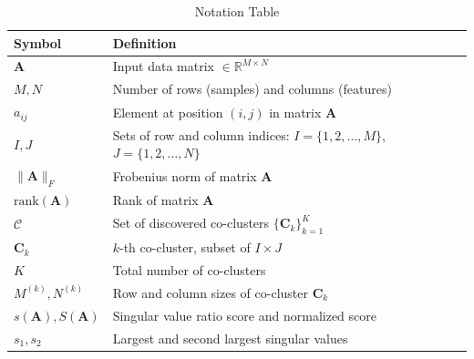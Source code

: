\documentclass[journal]{IEEEtran}
\theoremstyle{definition}
\theoremstyle{remark} %
\begin{document}
    {\color{blue}
        \begin{table}[htbp]
            \centering
            \caption{Notation Table}
            \label{tab:notation}
            \begin{tabular}{@{} p{} p{} @{}}
                \toprule
                \textbf{Symbol}                    & \textbf{Definition}                                                             \\
                \midrule
                $\mathbf{A}$                       & Input data matrix $\in \mathbb{R}^{M \times N}$                                 \\
                $M, N$                             & Number of rows (samples) and columns (features)                                 \\
                $a_{ij}$                           & Element at position $(i,j)$ in matrix $\mathbf{A}$                              \\
                $I, J$                             & Sets of row and column indices: $I = \{1,2,\ldots,M\}$, $J = \{1,2,\ldots,N\}$  \\
                $\|\mathbf{A}\|_F$                 & Frobenius norm of matrix $\mathbf{A}$                                           \\
                $\text{rank}(\mathbf{A})$          & Rank of matrix $\mathbf{A}$                                                     \\
                $\mathcal{C}$                      & Set of discovered co-clusters $\{\mathbf{C}_k\}_{k=1}^K$                        \\
                $\mathbf{C}_k$                     & $k$-th co-cluster, subset of $I \times J$                                       \\
                $K$                                & Total number of co-clusters                                                     \\
                $M^{(k)}, N^{(k)}$                 & Row and column sizes of co-cluster $\mathbf{C}_k$                               \\
                $s(\mathbf{A}), S(\mathbf{A})$     & Singular value ratio score and normalized score                                 \\
                $s_1, s_2$                         & Largest and second largest singular values                                      \\

\end{tabular}
\end{table}}
\end{document}
